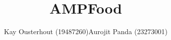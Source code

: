 \documentclass[10pt]{article}
\begin{document}
\title{AMPFood}
\author{Kay Ousterhout (19487260)\hspace{2in}Aurojit Panda (23273001)}
\date{}
\maketitle




 
\end{document}
